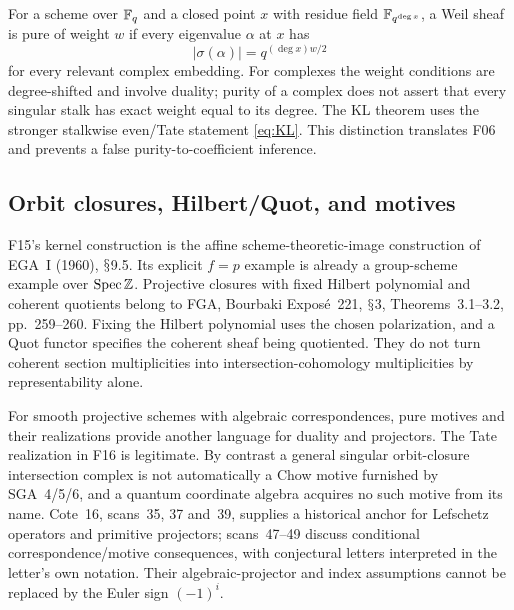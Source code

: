\documentclass[11pt,a4paper]{article}
\renewcommand{\S}{\ensuremath{\mathsection}}
\newcommand{\fid}[1]{\textsf{#1}}\newcommand{\gate}[1]{\textsf{#1}}
\theoremstyle{named}\newtheorem{finding}{Finding}[section]
\theoremstyle{definition}\newtheorem{definition}[finding]{Definition}
\theoremstyle{remark}\newtheorem{remark}[finding]{Remark}
\begin{document}
For a scheme over $\mathbb F_q$ and a closed point $x$ with residue field $\mathbb F_{q^{\deg x}}$, a Weil sheaf is pure of weight $w$ if every eigenvalue $\alpha$ at $x$ has
\[
 |\sigma(\alpha)|=q^{(\deg x)w/2}
\]
for every relevant complex embedding. For complexes the weight conditions are degree-shifted and involve duality; purity of a complex does not assert that every singular stalk has exact weight equal to its degree. The KL theorem uses the stronger stalkwise even/Tate statement \eqref{eq:KL}. This distinction translates \fid{F06} and prevents a false purity-to-coefficient inference.

\subsection{Orbit closures, Hilbert/Quot, and motives}
\fid{F15}'s kernel construction is the affine scheme-theoretic-image construction of EGA~I (1960), \S9.5. Its explicit $f=p$ example is already a group-scheme example over $\operatorname{Spec}\mathbb Z$. Projective closures with fixed Hilbert polynomial and coherent quotients belong to FGA, Bourbaki Expos\'e~221, \S3, Theorems~3.1--3.2, pp.~259--260. Fixing the Hilbert polynomial uses the chosen polarization, and a Quot functor specifies the coherent sheaf being quotiented. They do not turn coherent section multiplicities into intersection-cohomology multiplicities by representability alone.

For smooth projective schemes with algebraic correspondences, pure motives and their realizations provide another language for duality and projectors. The Tate realization in \fid{F16} is legitimate. By contrast a general singular orbit-closure intersection complex is not automatically a Chow motive furnished by SGA~4/5/6, and a quantum coordinate algebra acquires no such motive from its name. Cote~16, scans~35, 37 and~39, supplies a historical anchor for Lefschetz operators and primitive projectors; scans~47--49 discuss conditional correspondence/motive consequences, with conjectural letters interpreted in the letter's own notation. Their algebraic-projector and index assumptions cannot be replaced by the Euler sign $(-1)^i$.
\end{document}

